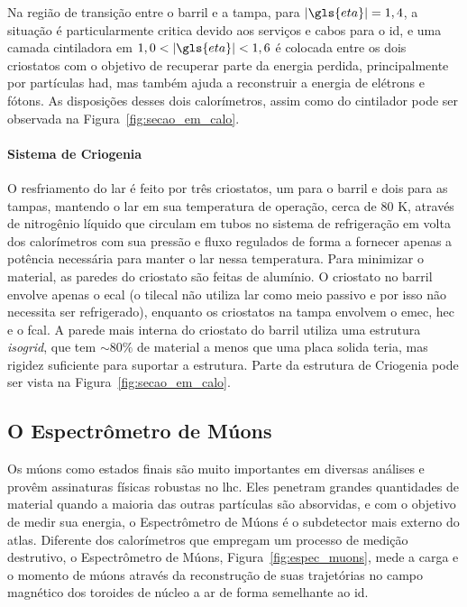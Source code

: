 Na região de transição entre o barril e a tampa, para
$|\gls{eta}| = 1,4$, a situação é particularmente critica devido aos serviços e
cabos para o \gls{id}, e uma camada cintiladora em $1,0<|\gls{eta}|<1,6$ 
é colocada entre os dois criostatos com o objetivo de recuperar parte 
da energia perdida, principalmente por
partículas \gls{had}, mas também ajuda a reconstruir a energia de elétrons e
fótons. As disposições desses dois calorímetros, assim como do cintilador pode 
ser observada na Figura~\ref{fig:secao_em_calo}. 


\paragraph{Sistema de Criogenia}
\label{par:cal_criogenia}

O resfriamento do \gls{lar} é feito por três criostatos, 
um para o barril e dois para as tampas, mantendo o \gls{lar} em sua temperatura
de operação, cerca de 80 K, através de nitrogênio líquido que circulam em tubos
no sistema de refrigeração em volta dos calorímetros com sua pressão e fluxo
regulados de forma a fornecer apenas a potência necessária para manter o
\gls{lar} nessa temperatura. Para minimizar o material, as paredes do criostato
são feitas de alumínio. O criostato no barril envolve apenas o
\gls{ecal} (o \gls{tilecal} não utiliza \gls{lar} como meio passivo e por
isso não necessita ser refrigerado), enquanto os criostatos na tampa envolvem o \gls{emec},
\gls{hec} e o \gls{fcal}. A parede mais interna do criostato do
barril utiliza uma estrutura \emph{isogrid}, que tem $\sim80\%$ de material a
menos que uma placa solida teria, mas rigidez suficiente para suportar a
estrutura. Parte da estrutura de Criogenia pode ser vista na
Figura~\ref{fig:secao_em_calo}.


\subsection{O Espectrômetro de Múons}
\label{ssec:espectometro_muons}

Os múons como estados finais são muito importantes em diversas análises e provêm
assinaturas físicas robustas no \gls{lhc}. 
Eles penetram grandes quantidades de material quando a maioria das outras
partículas são absorvidas, e com o objetivo de medir sua energia, o Espectrômetro
de Múons \cite{muon_tdr} é o subdetector mais externo do \gls{atlas}. Diferente dos calorímetros
que empregam um processo de medição destrutivo, o Espectrômetro de Múons,
Figura~\ref{fig:espec_muons}, mede a carga e o momento de múons através 
da reconstrução de suas trajetórias no 
campo magnético dos toroides de núcleo a ar de forma semelhante ao \gls{id}. 


